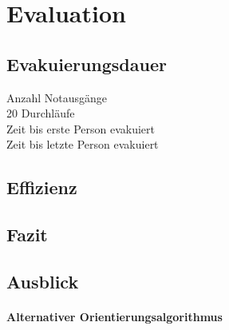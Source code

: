 \chapter{Evaluation}
\label{cha:evaluation}



\section{Evakuierungsdauer}

Anzahl Notausgänge\\
20 Durchläufe\\
Zeit bis erste Person evakuiert\\
Zeit bis letzte Person evakuiert\\


\section{Effizienz}

\section{Fazit}

\section{Ausblick}

\subsubsection{Alternativer Orientierungsalgorithmus}
\label{sec:bug-0}

